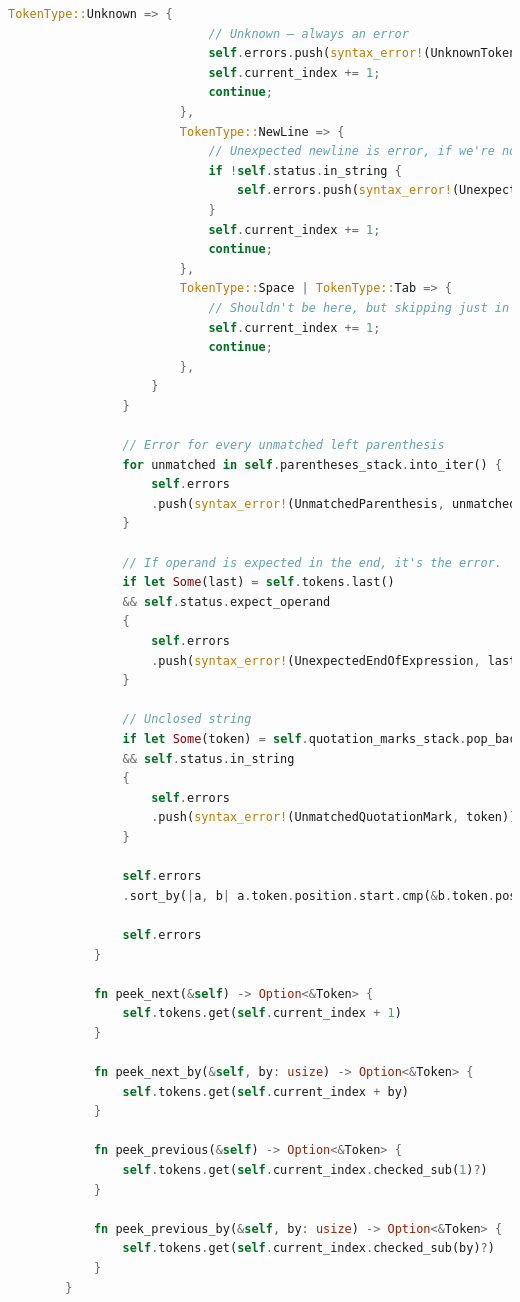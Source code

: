 \documentclass[14pt, a4paper]{extreport}
\begin{document}
\begin{lstlisting}[language=Rust]
						TokenType::Unknown => {
							// Unknown — always an error
							self.errors.push(syntax_error!(UnknownToken, token));
							self.current_index += 1;
							continue;
						},
						TokenType::NewLine => {
							// Unexpected newline is error, if we're not in string
							if !self.status.in_string {
								self.errors.push(syntax_error!(UnexpectedNewLine, token));
							}
							self.current_index += 1;
							continue;
						},
						TokenType::Space | TokenType::Tab => {
							// Shouldn't be here, but skipping just in case
							self.current_index += 1;
							continue;
						},
					}
				}
				
				// Error for every unmatched left parenthesis
				for unmatched in self.parentheses_stack.into_iter() {
					self.errors
					.push(syntax_error!(UnmatchedParenthesis, unmatched));
				}
				
				// If operand is expected in the end, it's the error.
				if let Some(last) = self.tokens.last()
				&& self.status.expect_operand
				{
					self.errors
					.push(syntax_error!(UnexpectedEndOfExpression, last));
				}
				
				// Unclosed string
				if let Some(token) = self.quotation_marks_stack.pop_back()
				&& self.status.in_string
				{
					self.errors
					.push(syntax_error!(UnmatchedQuotationMark, token));
				}
				
				self.errors
				.sort_by(|a, b| a.token.position.start.cmp(&b.token.position.start));
				
				self.errors
			}
			
			fn peek_next(&self) -> Option<&Token> {
				self.tokens.get(self.current_index + 1)
			}
			
			fn peek_next_by(&self, by: usize) -> Option<&Token> {
				self.tokens.get(self.current_index + by)
			}
			
			fn peek_previous(&self) -> Option<&Token> {
				self.tokens.get(self.current_index.checked_sub(1)?)
			}
			
			fn peek_previous_by(&self, by: usize) -> Option<&Token> {
				self.tokens.get(self.current_index.checked_sub(by)?)
			}
		}
	\end{lstlisting}
	
\end{document}
